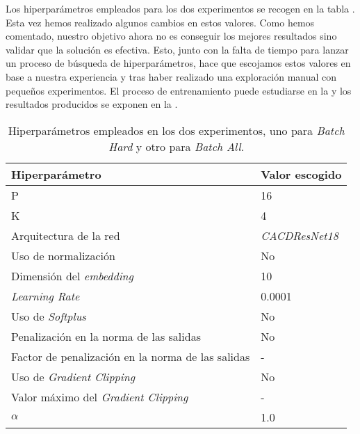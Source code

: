 Los hiperparámetros empleados para los dos experimentos se recogen en la tabla . Esta vez hemos realizado algunos cambios en estos valores. Como hemos comentado, nuestro objetivo ahora no es conseguir los mejores resultados sino validar que la solución es efectiva. Esto, junto con la falta de tiempo para lanzar un proceso de búsqueda de hiperparámetros, hace que escojamos estos valores en base a nuestra experiencia y tras haber realizado una exploración manual con pequeños experimentos. El proceso de entrenamiento puede estudiarse en la  y los resultados producidos se exponen en la .

\begin{table}[!hbt]
    \centering
    \begin{tabular}{|l|l|}
        \hline
        Hiperparámetro                                    & Valor escogido        \\
        \hline
        P                                                 & 16                    \\
        K                                                 & 4                     \\
        Arquitectura de la red                            & \textit{CACDResNet18} \\
        Uso de normalización                              & No                    \\
        Dimensión del \textit{embedding}                  & 10                    \\
        \textit{Learning Rate}                            & 0.0001                \\
        Uso de \textit{Softplus}                          & No                    \\
        Penalización en la norma de las salidas           & No                    \\
        Factor de penalización en la norma de las salidas & -                     \\
        Uso de \textit{Gradient Clipping}                 & No                    \\
        Valor máximo del \textit{Gradient Clipping}       & -                     \\
        $\alpha$                                          & 1.0                   \\

        \hline
    \end{tabular}
    \caption{Hiperparámetros empleados en los dos experimentos, uno para \textit{Batch Hard} y otro para \textit{Batch All}.}
    \label{table:hp_cacd_corregido}
\end{table}

